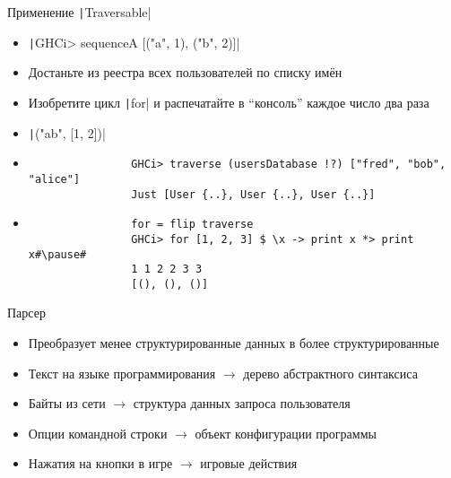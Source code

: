     \begin{frame}[fragile]{Применение \texttt|Traversable|}
        \begin{itemize}
            \item[\todo] \texttt|GHCi> sequenceA [("a", 1), ("b", 2)]|
            \item[\todo] Достаньте из реестра всех пользователей по списку имён
            \item[\todo] Изобретите цикл \texttt|for| и распечатайте в ``консоль'' каждое число два раза
            \item[\answer] \pause \texttt|("ab", [1, 2])|
            \item[\answer] \pause
            \begin{verbatim}
                GHCi> traverse (usersDatabase !?) ["fred", "bob", "alice"]
                Just [User {..}, User {..}, User {..}]
            \end{verbatim}
            \item[\answer] \pause
            \begin{verbatim}
                for = flip traverse
                GHCi> for [1, 2, 3] $ \x -> print x *> print x#\pause#
                1 1 2 2 3 3
                [(), (), ()]
            \end{verbatim}
        \end{itemize}
    \end{frame}


    \begin{frame}[fragile]{Парсер}
        \vspace{-0.5em}
        \begin{itemize}
            \item[\defi] Преобразует менее структурированные данных в более структурированные
            \item[\eg] Текст на языке программирования $\to$ дерево абстрактного синтаксиса
            \item[\eg] Байты из сети $\to$ структура данных запроса пользователя
            \item[\eg] Опции командной строки $\to$ объект конфигурации программы
            \item[\eg] Нажатия на кнопки в игре $\to$ игровые действия
        \end{itemize}
    \end{frame}

